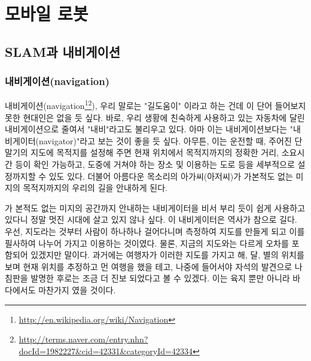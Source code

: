 
\chapter{모바일 로봇}

\section{SLAM과 내비게이션}

\subsection{내비게이션(navigation)}

내비게이션(navigation\footnote{\url{http://en.wikipedia.org/wiki/Navigation}}\footnote{\url{http://terms.naver.com/entry.nhn?docId=1982227\&cid=42331\&categoryId=42334}}), 우리 말로는 "길도움이" 이라고 하는 건데 이 단어 들어보지 못한 현대인은 없을 듯 싶다. 바로, 우리 생황에 친숙하게 사용하고 있는 자동차에 달린 내비게이션으로 줄여서 "내비"라고도 불리우고 있다. 아마 이는 내비게이션보다는 "내비게이터(navigator)"라고 보는 것이 좋을 듯 싶다. 아무튼, 이는 운전할 때, 주어진 단말기의 지도에 목적지를 설정해 주면 현재 위치에서 목적지까지의 정확한 거리, 소요시간 등이 확인 가능하고, 도중에 거쳐야 하는 장소 및 이용하는 도로 등을 세부적으로 설정까지할 수 있도 있다. 더불어 아름다운 목소리의 아가씨(아저씨)가 가본적도 없는 미지의 목적지까지의 우리의 길을 안내하게 된다. 

가 본적도 없는 미지의 공간까지 안내하는 내비게이터을 비서 부리 듯이 쉽게 사용하고 있다니 정말 멋진 시대에 살고 있지 않나 싶다. 이 내비게이터은 역사가 참으로 길다. 우선, 지도라는 것부터 사람이 하나하나 걸어다니며 측정하여 지도를 만들게 되고 이를 필사하여 나누어 가지고 이용하는 것이였다. 물론, 지금의 지도와는 다르게 오차를 포함되어 있겠지만 말이다. 과거에는 여행자가 이러한 지도를 가지고 해, 달, 별의 위치를 보며 현재 위치를 추정하고 먼 여행을 했을 테고, 나중에 들어서야 자석의 발견으로 나침판을 발명한 후로는 조금 더 진보 되었다고 볼 수 있겠다. 이는 육지 뿐만 아니라 바다에서도 마찬가지 였을 것이다.

